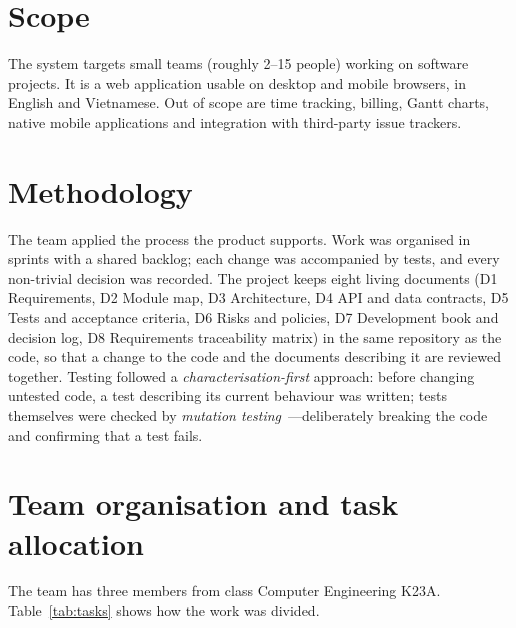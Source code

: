\documentclass[../main.tex]{subfiles}
\begin{document}
\section{Scope}
The system targets small teams (roughly 2--15 people) working on software projects. It is a web
application usable on desktop and mobile browsers, in English and Vietnamese. Out of scope are time
tracking, billing, Gantt charts, native mobile applications and integration with third-party issue
trackers.

\section{Methodology}
The team applied the process the product supports. Work was organised in sprints with a shared
backlog; each change was accompanied by tests, and every non-trivial decision was recorded. The
project keeps eight living documents (D1 Requirements, D2 Module map, D3 Architecture, D4 API and
data contracts, D5 Tests and acceptance criteria, D6 Risks and policies, D7 Development book and
decision log, D8 Requirements traceability matrix) in the same repository as the code, so that a
change to the code and the documents describing it are reviewed together. Testing followed a
\emph{characterisation-first} approach: before changing untested code, a test describing its
current behaviour was written; tests themselves were checked by \emph{mutation
testing}~\cite{demillo1978mutation}---deliberately breaking the code and confirming that a test
fails.

\section{Team organisation and task allocation}
The team has three members from class Computer Engineering K23A. Table~\ref{tab:tasks} shows how
the work was divided.
\end{document}
